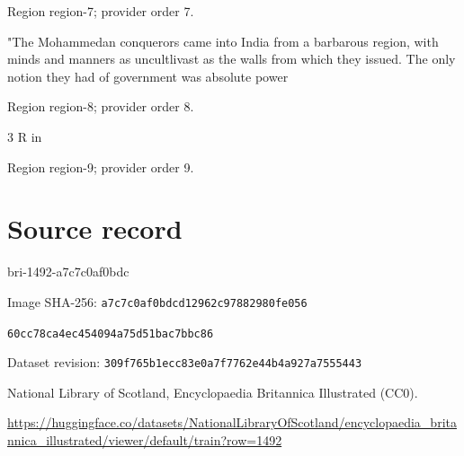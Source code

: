 \documentclass[11pt]{article}
\begin{document}
{\scriptsize\color{gray} Region region-7; provider order 7.\par}
\medskip

"The Mohammedan conquerors came into India from a barbarous region, with minds and manners as uncultlivast as the walls from which they issued. The only notion they had of government was absolute power
\par

{\scriptsize\color{gray} Region region-8; provider order 8.\par}
\medskip

3 R in
\par

{\scriptsize\color{gray} Region region-9; provider order 9.\par}
\medskip
\newpage\section*{Source record}
bri-1492-a7c7c0af0bdc\par
Image SHA-256: \texttt{a7c7c0af0bdcd12962c97882980fe056}\par\texttt{60cc78ca4ec454094a75d51bac7bbc86}\par
Dataset revision: \texttt{309f765b1ecc83e0a7f7}\texttt{762e44b4a927a7555443}\par
National Library of Scotland, Encyclopaedia Britannica Illustrated (CC0).\par
\url{https://huggingface.co/datasets/NationalLibraryOfScotland/encyclopaedia_britannica_illustrated/viewer/default/train?row=1492}
\end{document}

